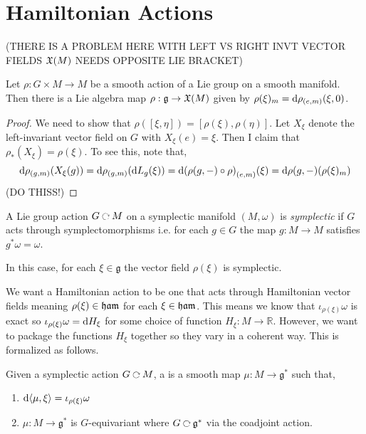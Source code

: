 \documentclass[12pt]{extarticle}
\newcommand{\R}{\mathbb{R}}
\begin{document}
\section{Hamiltonian Actions}

\newcommand{\g}{\mathfrak{g}}
\newcommand{\inner}[2]{\left< #1 , #2 \right>}

(THERE IS A PROBLEM HERE WITH LEFT VS RIGHT INVT VECTOR FIELDS $\mathfrak{X}(M)$ NEEDS OPPOSITE LIE BRACKET) 

\begin{lemma}
Let $\rho : G \times M \to M$ be a smooth action of a Lie group on a smooth manifold. Then there is a Lie algebra map $\rho : \g \to \X(M)$ given by $\rho(\xi)_m = \mathrm{d}{\rho}_{(e, m)}(\xi, 0)$.
\end{lemma}

\begin{proof}
We need to show that $\rho([\xi,\eta]) = [\rho(\xi), \rho(\eta)]$. Let $X_\xi$ denote the left-invariant vector field on $G$ with $X_\xi(e) = \xi$. Then I claim that $\rho_*(X_\xi) = \rho(\xi)$. To see this, note that,
\[ \mathrm{d}{\rho}_{(g,m)}(X_\xi(g)) = \mathrm{d}{\rho}_{(g,m)}(\mathrm{d}{L_g}(\xi)) = \mathrm{d}{(\rho(g,-) \circ \rho)}_{(e,m)}(\xi) = \mathrm{d}{\rho(g,-)}(\rho(\xi)_m) \]
(DO THISS!)
\end{proof}

\begin{defn}
A Lie group action $G \acts M$ on a symplectic manifold $(M, \omega)$ is \textit{symplectic} if $G$ acts through symplectomorphisms i.e. for each $g \in G$ the map $g : M \to M$ satisfies $g^* \omega = \omega$.
\end{defn}

\begin{rmk}
In this case, for each $\xi \in \g$ the vector field $\rho(\xi)$ is symplectic.
\end{rmk}

\begin{rmk}
We want a Hamiltonian action to be one that acts through Hamiltonian vector fields meaning $\rho(\xi) \in \mathfrak{ham}$ for each $\xi \in \mathfrak{ham}$. This means we know that $\iota_{\rho(\xi)} \omega$ is exact so $\iota_{\rho(\xi)} \omega = \mathrm{d}{H_\xi}$ for some choice of function $H_\xi : M \to \R$. However, we want to package the functions $H_\xi$ together so they vary in a coherent way. This is formalized as follows.
\end{rmk}

\begin{defn}
Given a symplectic action $G \acts M$, a  is a smooth map $\mu : M \to \g^*$ such that,
\begin{enumerate}
\item $\d{\inner{\mu}{\xi}} = \iota_{\rho(\xi)} \omega$

\item $\mu : M \to \g^*$ is $G$-equivariant where $G \acts \g^*$ via the coadjoint action.
\end{enumerate}
\end{defn}
\end{document}
